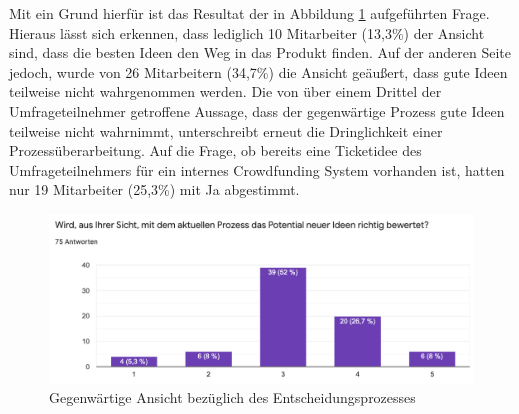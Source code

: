 Mit ein Grund hierfür ist das Resultat der in Abbildung \ref{fig:frage7} aufgeführten Frage. Hieraus lässt sich erkennen, dass lediglich 10 Mitarbeiter (13,3\%) der Ansicht sind, dass die besten Ideen den Weg in das Produkt finden. Auf der anderen Seite jedoch, wurde von 26 Mitarbeitern (34,7\%) die Ansicht geäußert, dass gute Ideen teilweise nicht wahrgenommen werden. Die von über einem Drittel der Umfrageteilnehmer getroffene Aussage, dass der gegenwärtige Prozess gute Ideen teilweise nicht wahrnimmt, unterschreibt erneut die Dringlichkeit einer Prozessüberarbeitung. Auf die Frage, ob bereits eine Ticketidee des Umfrageteilnehmers für ein internes Crowdfunding System vorhanden ist, hatten nur 19 Mitarbeiter (25,3\%) mit \glqq{}Ja\grqq{} abgestimmt. 
\begin{figure}[b]
	\centering
	\includegraphics[width=\textwidth]{images/Frage7}
	\caption{Gegenwärtige Ansicht bezüglich des Entscheidungsprozesses}
	\label{fig:frage7}
\end{figure} 
